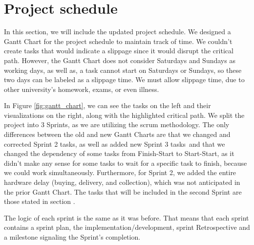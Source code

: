 \chapter{Project schedule}

In this section, we will include the updated project schedule. We designed a Gantt Chart for the project schedule to maintain track of time. We couldn't create tasks that would indicate a slippage since it would disrupt the critical path. However, the Gantt Chart does not consider Saturdays and Sundays as working days, as well as, a task cannot start on Saturdays or Sundays, so these two days can be labeled as a slippage time. We must allow slippage time, due to other university's homework, exams, or even illness.

In Figure \ref{fig:gantt_chart}, we can see the tasks on the left and their visualizations on the right, along with the highlighted critical path. We split the project into 3 Sprints, as we are utilizing the scrum methodology. The only differences between the old and new Gantt Charts are that we changed and corrected Sprint 2 tasks, as well as added new Sprint 3 tasks and that we changed the dependency of some tasks from Finish-Start to Start-Start, as it didn't make any sense for some tasks to wait for a specific task to finish, because we could work simultaneously. Furthermore, for Sprint 2, we added the entire hardware delay (buying, delivery, and collection), which was not anticipated in the prior Gantt Chart. The tasks that will be included in the second Sprint are those stated in section .

The logic of each sprint is the same as it was before. That means that each sprint contains a sprint plan, the implementation/development, sprint Retrospective and a milestone signaling the Sprint's completion.


